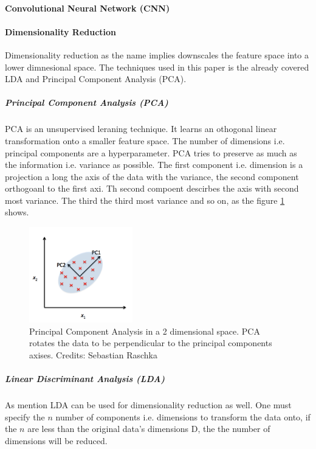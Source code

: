 \paragraph{Convolutional Neural Network (CNN)}

\paragraph{Dimensionality Reduction}

Dimensionality reduction as the name implies downscales the feature space into a lower dimnesional space. The techniques used in this paper is the already covered LDA and Principal Component Analysis (PCA).

\subparagraph{Principal Component Analysis (PCA)}

PCA is an unsupervised leraning technique. It learns an othogonal linear transformation onto a smaller feature space. The number of dimensions i.e. principal components are a hyperparameter. PCA tries to preserve as much as the information i.e. variance as possible. The first component i.e. dimension is a projection a long the axis of the data with the variance, the second component orthogoanl to the first axi. Th second compoent descirbes the axis with second most variance. The third the third most variance and so on, as the figure \ref{fig:pca} shows.

\begin{figure}[H]
    \centering
    \includegraphics[width=0.4\textwidth]{figures/pca.png}
    \caption[]{Principal Component Analysis in a 2 dimensional space. PCA rotates the data to be perpendicular to the principal components axises. Credits: Sebastian Raschka}
    \label{fig:pca}
\end{figure}

\subparagraph{Linear Discriminant Analysis (LDA)}
As mention LDA can be used for dimensionality reduction as well. One must specify the $n$ number of components i.e. dimensions to transform the data onto, if the $n$ are less than the original data's dimensions D, the the number of dimensions will be reduced. 

